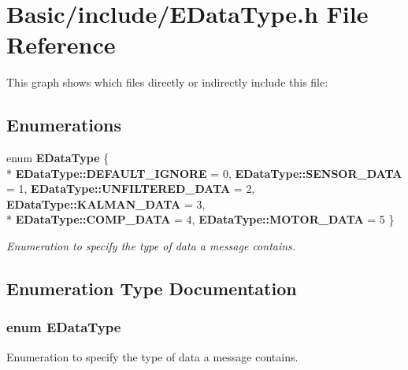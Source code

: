\section{Basic/include/\-E\-Data\-Type.h File Reference}
\label{EDataType_8h}
This graph shows which files directly or indirectly include this file\-:
\subsection*{Enumerations}
\begin{DoxyCompactItemize}
\item 
enum {\bf E\-Data\-Type} \{ \\*
{\bf E\-Data\-Type\-::\-D\-E\-F\-A\-U\-L\-T\-\_\-\-I\-G\-N\-O\-R\-E} = 0, 
{\bf E\-Data\-Type\-::\-S\-E\-N\-S\-O\-R\-\_\-\-D\-A\-T\-A} = 1, 
{\bf E\-Data\-Type\-::\-U\-N\-F\-I\-L\-T\-E\-R\-E\-D\-\_\-\-D\-A\-T\-A} = 2, 
{\bf E\-Data\-Type\-::\-K\-A\-L\-M\-A\-N\-\_\-\-D\-A\-T\-A} = 3, 
\\*
{\bf E\-Data\-Type\-::\-C\-O\-M\-P\-\_\-\-D\-A\-T\-A} = 4, 
{\bf E\-Data\-Type\-::\-M\-O\-T\-O\-R\-\_\-\-D\-A\-T\-A} = 5
 \}
\begin{DoxyCompactList}\small\item\em Enumeration to specify the type of data a message contains. \end{DoxyCompactList}\end{DoxyCompactItemize}


\subsection{Enumeration Type Documentation}
\subsubsection[{E\-Data\-Type}]{\setlength{\rightskip}{0pt plus 5cm}enum {\bf E\-Data\-Type}\hspace{0.3cm}{\ttfamily [strong]}}\label{EDataType_8h_add4d321bb9cc51030786d53d76b8b0bd}


Enumeration to specify the type of data a message contains. 

